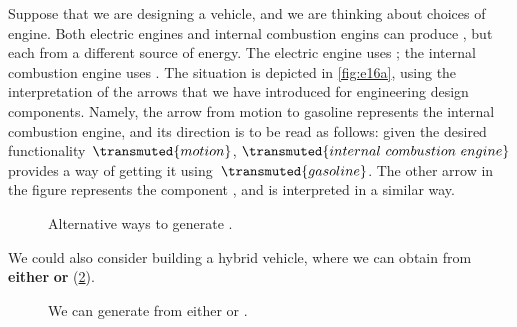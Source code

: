 \begin{example}
    Suppose that we are designing a vehicle, and we are thinking about choices of engine. Both electric engines and internal combustion engins can produce , but each from a different source of energy. The electric engine uses ; the internal combustion engine uses . The situation is depicted in \cref{fig:e16a}, using the interpretation of the arrows that we have introduced for engineering design components. Namely, the arrow from motion to gasoline represents the internal combustion engine, and its direction is to be read as follows: given the desired functionality~$\transmuted{motion}$, $\transmuted{internal \ combustion \ engine}$ provides a way of getting it using~$\transmuted{gasoline}$. The other arrow in the figure represents the component , and is interpreted in a similar way.


    \begin{figure}[h!]
        \centering
        \caption{Alternative ways to generate . }
        \label{fig:e14}
    \end{figure}

    We could also consider building a hybrid vehicle, where we can obtain  from \textbf{either}  \textbf{or}  (\cref{fig:e15}).

    \begin{figure}[h!]
        \centering
        \caption{We can generate  from either  or  .}
        \label{fig:e15}
    \end{figure}
\end{example}

